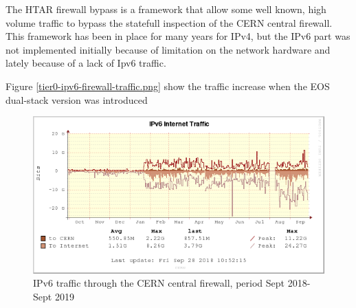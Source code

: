 The HTAR firewall bypass is a framework that allow some well known, high volume traffic to bypass the statefull inspection of the CERN central firewall. This framework has been in place for many years for IPv4, but the IPv6 part was not implemented initially because of limitation on the network hardware and lately because of a lack of Ipv6 traffic.

Figure \ref{tier0-ipv6-firewall-traffic.png} show the traffic increase when the EOS dual-stack version was introduced

\begin{figure}[h!]
\centering
\includegraphics[width=5.6 in]{tier0-ipv6-firewall-traffic.png}
\caption{IPv6 traffic through the CERN central firewall, period Sept 2018-Sept 2019}
\label{fig:tier0-traffic}
\end{figure}
